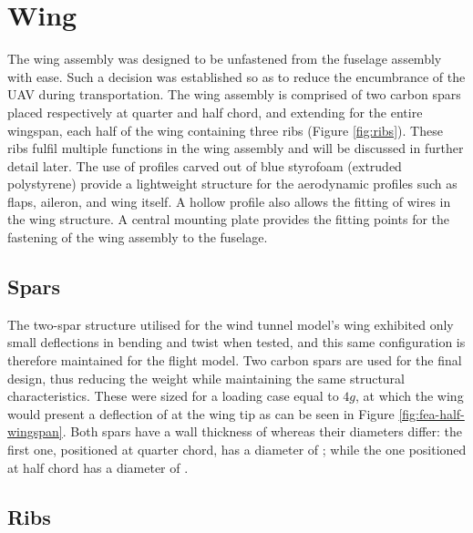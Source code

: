 \documentclass[../../main.tex]{subfiles}
\begin{document}

\section{Wing} \label{sec:final-design-proposal:wing}

The wing assembly was designed to be unfastened from the fuselage assembly with ease.
Such a decision was established so as to reduce the encumbrance of the UAV during transportation.
The wing assembly is comprised of two carbon spars placed respectively at quarter and half chord, and extending for the entire  wingspan, each half of the wing containing three ribs (Figure \ref{fig:ribs}).
These ribs fulfil multiple functions in the wing assembly and will be discussed in further detail later.
The use of profiles carved out of blue styrofoam (extruded polystyrene) provide a lightweight structure for the aerodynamic profiles such as flaps, aileron, and wing itself.
A hollow profile also allows the fitting of wires in the wing structure.
A central mounting plate provides the fitting points for the fastening of the wing assembly to the fuselage.

\subsection{Spars} \label{sec:final-design-proposal:wing:spars}

The two-spar structure utilised for the wind tunnel model's wing exhibited only small deflections in bending and twist when tested, and this same configuration is therefore maintained for the flight model.
Two carbon spars are used for the final design, thus reducing the weight while maintaining the same structural characteristics.
These were sized for a loading case equal to $4g$, at which the wing would present a deflection of  at the wing tip as can be seen in Figure \ref{fig:fea-half-wingspan}.
Both spars have a wall thickness of  whereas their diameters differ: the first one, positioned at quarter chord, has a diameter of ; while the one positioned at half chord has a diameter of .


\subsection{Ribs} \label{sec:final-design-proposal:wing:ribs}
\end{document}
